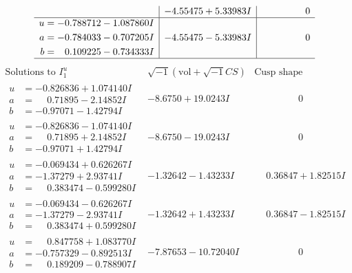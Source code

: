\documentclass[1p]{elsarticle_modified}
\theoremstyle{definition}
\newcommand{\I}{\sqrt{-1}}
\begin{document}
$$\begin{array}{c|c|c}
 & -4.55475 + 5.33983 I & \phantom{-0.000000 } 0 \\ \hline\begin{aligned}
u &= -0.788712 - 1.087860 I \\
a &= -0.784033 - 0.707205 I \\
b &= \phantom{-}0.109225 - 0.734333 I\end{aligned}
 & -4.55475 - 5.33983 I & \phantom{-0.000000 } 0\\
 \hline 
 \end{array}$$\newpage$$\begin{array}{c|c|c}  
\text{Solutions to }I^u_{1}& \I (\text{vol} + \sqrt{-1}CS) & \text{Cusp shape}\\
 \hline 
\begin{aligned}
u &= -0.826836 + 1.074140 I \\
a &= \phantom{-}0.71895 - 2.14852 I \\
b &= -0.97071 - 1.42794 I\end{aligned}
 & -8.6750 + 19.0243 I & \phantom{-0.000000 } 0 \\ \hline\begin{aligned}
u &= -0.826836 - 1.074140 I \\
a &= \phantom{-}0.71895 + 2.14852 I \\
b &= -0.97071 + 1.42794 I\end{aligned}
 & -8.6750 - 19.0243 I & \phantom{-0.000000 } 0 \\ \hline\begin{aligned}
u &= -0.069434 + 0.626267 I \\
a &= -1.37279 + 2.93741 I \\
b &= \phantom{-}0.383474 - 0.599280 I\end{aligned}
 & -1.32642 - 1.43233 I & \phantom{-}0.36847 + 1.82515 I \\ \hline\begin{aligned}
u &= -0.069434 - 0.626267 I \\
a &= -1.37279 - 2.93741 I \\
b &= \phantom{-}0.383474 + 0.599280 I\end{aligned}
 & -1.32642 + 1.43233 I & \phantom{-}0.36847 - 1.82515 I \\ \hline\begin{aligned}
u &= \phantom{-}0.847758 + 1.083770 I \\
a &= -0.757329 - 0.892513 I \\
b &= \phantom{-}0.189209 - 0.788907 I\end{aligned}
 & -7.87653 - 10.72040 I & \phantom{-0.000000 } 0 \\ \hline\begin{aligned}

\end{aligned}
\end{array}$$
\end{document}
